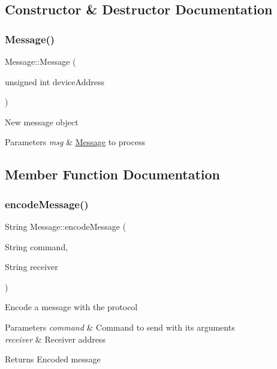 \subsection{Constructor \& Destructor Documentation}
\mbox{\label{class_message_a917d33658059b92ef6fe29f523cfc3d3}} 
\subsubsection{\texorpdfstring{Message()}{Message()}}
{\footnotesize\ttfamily Message\+::\+Message (\begin{DoxyParamCaption}\item[{unsigned int}]{device\+Address }\end{DoxyParamCaption})}

New message object 
\begin{DoxyParams}{Parameters}
{\em msg} & \hyperlink{class_message}{Message} to process \\
\hline
\end{DoxyParams}


\subsection{Member Function Documentation}
\mbox{\label{class_message_ac430b803b41d61f232a2bbfbba660623}} 
\subsubsection{\texorpdfstring{encode\+Message()}{encodeMessage()}}
{\footnotesize\ttfamily String Message\+::encode\+Message (\begin{DoxyParamCaption}\item[{String}]{command,  }\item[{String}]{receiver }\end{DoxyParamCaption})}

Encode a message with the protocol 
\begin{DoxyParams}{Parameters}
{\em command} & Command to send with its arguments \\
\hline
{\em receiver} & Receiver address \\
\hline
\end{DoxyParams}
\begin{DoxyReturn}{Returns}
Encoded message 
\end{DoxyReturn}
\mbox{\label{class_message_a50d4906b755edfcee40cb5f80fe4ac32}} 
